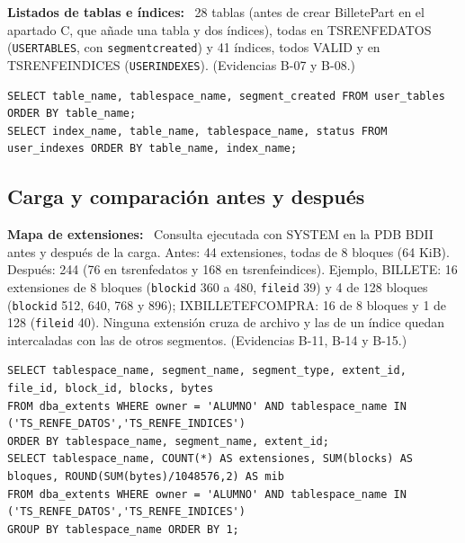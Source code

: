 \documentclass[11pt,a4paper]{article}
\DeclareRobustCommand{\_}{\textunderscore\allowbreak}
\newcommand{\tb}[1]{\texttt{#1}}
\newcommand{\campo}[1]{\textbf{#1:}~}                 %
\begin{document}
\campo{Listados de tablas e índices} 28 tablas (antes de crear Billete\_Part en el apartado C, que añade una tabla y dos índices), todas en TS\_RENFE\_DATOS (\tb{USER\_TABLES}, con \tb{segment\_created}) y 41 índices, todos VALID y en TS\_RENFE\_INDICES (\tb{USER\_INDEXES}). (Evidencias B-07 y B-08.)
\begin{lstlisting}
SELECT table_name, tablespace_name, segment_created FROM user_tables ORDER BY table_name;
SELECT index_name, table_name, tablespace_name, status FROM user_indexes ORDER BY table_name, index_name;
\end{lstlisting}

\subsection{Carga y comparación antes y después}

\campo{Mapa de extensiones} Consulta ejecutada con SYSTEM en la PDB BDII antes y después de la carga. Antes: 44 extensiones, todas de 8 bloques (64 KiB). Después: 244 (76 en ts\_renfe\_datos y 168 en ts\_renfe\_indices). Ejemplo, BILLETE: 16 extensiones de 8 bloques (\tb{block\_id} 360 a 480, \tb{file\_id} 39) y 4 de 128 bloques (\tb{block\_id} 512, 640, 768 y 896); IX\_BILLETE\_FCOMPRA: 16 de 8 bloques y 1 de 128 (\tb{file\_id} 40). Ninguna extensión cruza de archivo y las de un índice quedan intercaladas con las de otros segmentos. (Evidencias B-11, B-14 y B-15.)
\begin{lstlisting}
SELECT tablespace_name, segment_name, segment_type, extent_id, file_id, block_id, blocks, bytes
FROM dba_extents WHERE owner = 'ALUMNO' AND tablespace_name IN ('TS_RENFE_DATOS','TS_RENFE_INDICES')
ORDER BY tablespace_name, segment_name, extent_id;
SELECT tablespace_name, COUNT(*) AS extensiones, SUM(blocks) AS bloques, ROUND(SUM(bytes)/1048576,2) AS mib
FROM dba_extents WHERE owner = 'ALUMNO' AND tablespace_name IN ('TS_RENFE_DATOS','TS_RENFE_INDICES')
GROUP BY tablespace_name ORDER BY 1;
\end{lstlisting}
\end{document}
